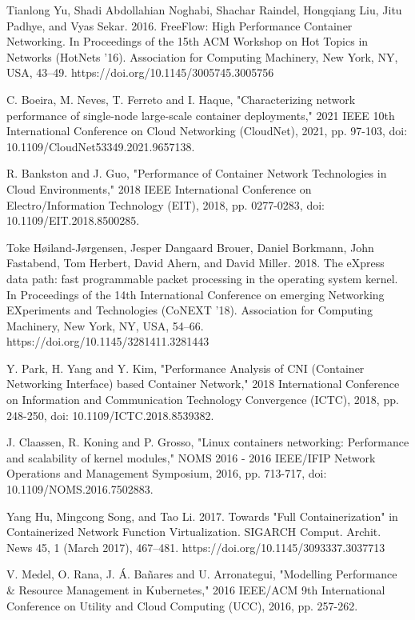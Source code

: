 \documentclass[conference]{IEEEtran}
\begin{document}
\begin{thebibliography}{1}
Tianlong Yu, Shadi Abdollahian Noghabi, Shachar Raindel, Hongqiang Liu, Jitu Padhye, and Vyas Sekar. 2016. FreeFlow: High Performance Container Networking. In Proceedings of the 15th ACM Workshop on Hot Topics in Networks (HotNets '16). Association for Computing Machinery, New York, NY, USA, 43–49. https://doi.org/10.1145/3005745.3005756

C. Boeira, M. Neves, T. Ferreto and I. Haque, "Characterizing network performance of single-node large-scale container deployments," 2021 IEEE 10th International Conference on Cloud Networking (CloudNet), 2021, pp. 97-103, doi: 10.1109/CloudNet53349.2021.9657138.

R. Bankston and J. Guo, "Performance of Container Network Technologies in Cloud Environments," 2018 IEEE International Conference on Electro/Information Technology (EIT), 2018, pp. 0277-0283, doi: 10.1109/EIT.2018.8500285.

Toke Høiland-Jørgensen, Jesper Dangaard Brouer, Daniel Borkmann, John Fastabend, Tom Herbert, David Ahern, and David Miller. 2018. The eXpress data path: fast programmable packet processing in the operating system kernel. In Proceedings of the 14th International Conference on emerging Networking EXperiments and Technologies (CoNEXT '18). Association for Computing Machinery, New York, NY, USA, 54–66. https://doi.org/10.1145/3281411.3281443

Y. Park, H. Yang and Y. Kim, "Performance Analysis of CNI (Container Networking Interface) based Container Network," 2018 International Conference on Information and Communication Technology Convergence (ICTC), 2018, pp. 248-250, doi: 10.1109/ICTC.2018.8539382.

J. Claassen, R. Koning and P. Grosso, "Linux containers networking: Performance and scalability of kernel modules," NOMS 2016 - 2016 IEEE/IFIP Network Operations and Management Symposium, 2016, pp. 713-717, doi: 10.1109/NOMS.2016.7502883.

Yang Hu, Mingcong Song, and Tao Li. 2017. Towards "Full Containerization" in Containerized Network Function Virtualization. SIGARCH Comput. Archit. News 45, 1 (March 2017), 467–481. https://doi.org/10.1145/3093337.3037713

V. Medel, O. Rana, J. Á. Bañares and U. Arronategui, "Modelling Performance \& Resource Management in Kubernetes," 2016 IEEE/ACM 9th International Conference on Utility and Cloud Computing (UCC), 2016, pp. 257-262.


\end{thebibliography}
\end{document}
